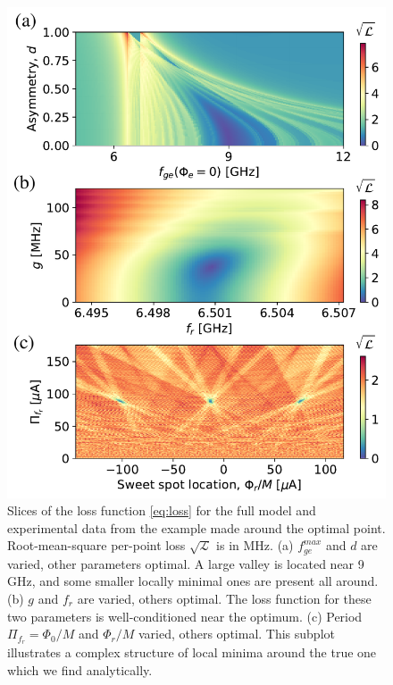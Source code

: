 \documentclass[%
 aip,
 amsmath,amssymb,
 reprint,%
]{revtex4-1}
\begin{document}
\begin{figure}
\centering
\includegraphics[width=\linewidth]{loss}
\caption{Slices of the loss function \eqref{eq:loss} for the full model and experimental data from the example made around the optimal point. Root-mean-square per-point loss $\sqrt{\mathcal{L}}$ is in MHz. (a) $f_{ge}^{max}$ and $d$ are varied, other parameters optimal. A large valley is located near 9 GHz, and some smaller locally minimal ones are present all around. (b) $g$ and $f_r$ are varied, others optimal. The loss function for these two parameters is well-conditioned near the optimum. (c) Period $\Pi_{f_r} = \Phi_0/M$ and $\Phi_r/M$ varied, others optimal. This subplot illustrates a complex structure of local minima around the true one which we find analytically.}
\label{fig:loss}
\end{figure}
\end{document}
